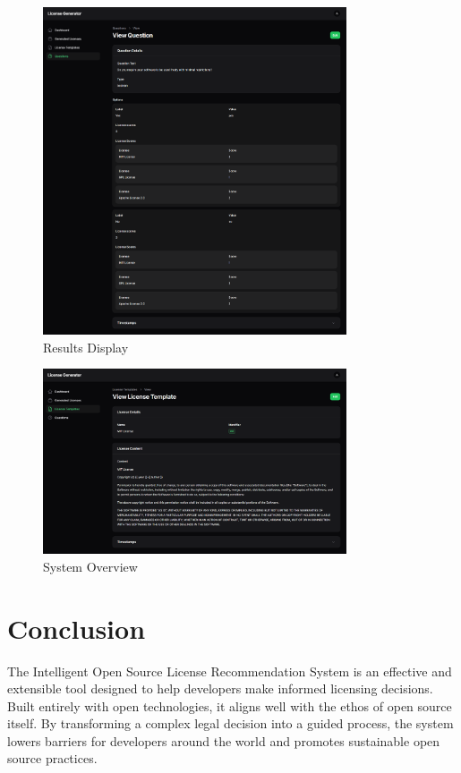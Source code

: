 \documentclass[12pt,a4paper]{report}
\begin{document}
\begin{figure}[H]
    \centering
    \includegraphics[width=0.8\textwidth]{Screenshots/os8.png}
    \caption{Results Display}
\end{figure}

\begin{figure}[H]
    \centering
    \includegraphics[width=0.8\textwidth]{Screenshots/os9.png}
    \caption{System Overview}
\end{figure}

\chapter{Conclusion}
The Intelligent Open Source License Recommendation System is an effective and extensible tool designed to help developers make informed licensing decisions. Built entirely with open technologies, it aligns well with the ethos of open source itself. By transforming a complex legal decision into a guided process, the system lowers barriers for developers around the world and promotes sustainable open source practices.
\end{document}
